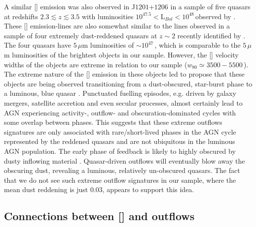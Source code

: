 A similar [] emission was also observed in J$1201$+$1206$ in a sample of five quasars at redshifts $2.3 \lesssim z \lesssim 3.5$ with luminosities $10^{47.5} < {\mathrm L_{Bol}} < 10^{48}$\,\ergs observed by \citet{bischetti16}.
These [] emission-lines are also somewhat similar to the lines observed in a sample of four extremely dust-reddened quasars at $z\sim2$ recently identified by \citet{zakamska16}. 
The four \citet{zakamska16} quasars have $5$\,$\mu$m luminosities of $\sim10^{47}$\,\ergs, which is comparable to the $5$\,$\mu$m luminosities of the brightest objects in our sample. 
However, the [] velocity widths of the \citet{zakamska16} objects are extreme in relation to our sample ($w_{80} \simeq 3500-5500$\,\kms). 
The extreme nature of the [] emission in these objects led \citet{zakamska16} to propose that these objects are being observed transitioning from a dust-obscured, star-burst phase to a luminous, blue quasar \citep[e.g.][]{sanders88}.
Punctuated fuelling episodes, e.g. driven by galaxy mergers, satellite accretion and even secular processes,
almost certainly lead to AGN experiencing activity-, outflow- and obscuration-dominated cycles with some overlap between phases. 
This suggests that these extreme outflows signatures are only associated with rare/short-lived phases in the AGN cycle represented by the reddened quasars and are not ubiquitous in the luminous AGN population.
The early phase of feedback is likely to highly obscured by dusty inflowing material \citep[e.g.][]{haas03}.
Quasar-driven outflows will eventually blow away the obscuring dust, revealing a luminous, relatively un-obscured quasars.  
The fact that we do not see such extreme outflow signatures in our sample, where the mean dust reddening is just $0.03$, appears to support this idea.     

\subsection{Connections between [] and  outflows}

